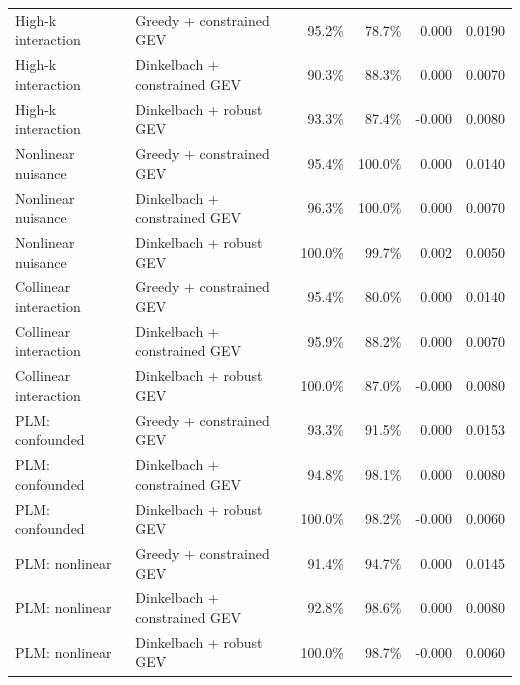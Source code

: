 \begin{table}[htbp]
{\begin{tabular}{@{}llrrrr@{}}
High-k interaction & Greedy + constrained GEV & 95.2\% & 78.7\% & 0.000 & 0.0190 \\
High-k interaction & Dinkelbach + constrained GEV & 90.3\% & 88.3\% & 0.000 & 0.0070 \\
High-k interaction & Dinkelbach + robust GEV & 93.3\% & 87.4\% & -0.000 & 0.0080 \\
Nonlinear nuisance & Greedy + constrained GEV & 95.4\% & 100.0\% & 0.000 & 0.0140 \\
Nonlinear nuisance & Dinkelbach + constrained GEV & 96.3\% & 100.0\% & 0.000 & 0.0070 \\
Nonlinear nuisance & Dinkelbach + robust GEV & 100.0\% & 99.7\% & 0.002 & 0.0050 \\
Collinear interaction & Greedy + constrained GEV & 95.4\% & 80.0\% & 0.000 & 0.0140 \\
Collinear interaction & Dinkelbach + constrained GEV & 95.9\% & 88.2\% & 0.000 & 0.0070 \\
Collinear interaction & Dinkelbach + robust GEV & 100.0\% & 87.0\% & -0.000 & 0.0080 \\
PLM: confounded & Greedy + constrained GEV & 93.3\% & 91.5\% & 0.000 & 0.0153 \\
PLM: confounded & Dinkelbach + constrained GEV & 94.8\% & 98.1\% & 0.000 & 0.0080 \\
PLM: confounded & Dinkelbach + robust GEV & 100.0\% & 98.2\% & -0.000 & 0.0060 \\
PLM: nonlinear & Greedy + constrained GEV & 91.4\% & 94.7\% & 0.000 & 0.0145 \\
PLM: nonlinear & Dinkelbach + constrained GEV & 92.8\% & 98.6\% & 0.000 & 0.0080 \\
PLM: nonlinear & Dinkelbach + robust GEV & 100.0\% & 98.7\% & -0.000 & 0.0060 \\
\bottomrule
\end{tabular}%
}
\end{table}
